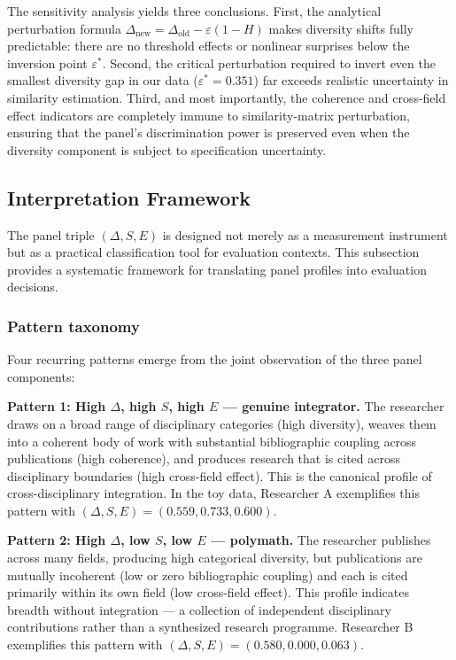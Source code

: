 \documentclass[
]{article}
\begin{document}
The sensitivity analysis yields three conclusions. First, the analytical
perturbation formula
\(\Delta_{\text{new}} = \Delta_{\text{old}} - \varepsilon(1-H)\) makes
diversity shifts fully predictable: there are no threshold effects or
nonlinear surprises below the inversion point \(\varepsilon^*\). Second,
the critical perturbation required to invert even the smallest diversity
gap in our data (\(\varepsilon^* = 0.351\)) far exceeds realistic
uncertainty in similarity estimation. Third, and most importantly, the
coherence and cross-field effect indicators are completely immune to
similarity-matrix perturbation, ensuring that the panel's discrimination
power is preserved even when the diversity component is subject to
specification uncertainty.

\hypertarget{interpretation-framework}{%
\subsection{Interpretation Framework}\label{interpretation-framework}}

The panel triple \((\Delta, S, E)\) is designed not merely as a
measurement instrument but as a practical classification tool for
evaluation contexts. This subsection provides a systematic framework for
translating panel profiles into evaluation decisions.

\hypertarget{pattern-taxonomy}{%
\subsubsection{Pattern taxonomy}\label{pattern-taxonomy}}

Four recurring patterns emerge from the joint observation of the three
panel components:

\textbf{Pattern 1: High \(\Delta\), high \(S\), high \(E\) --- genuine
integrator.} The researcher draws on a broad range of disciplinary
categories (high diversity), weaves them into a coherent body of work
with substantial bibliographic coupling across publications (high
coherence), and produces research that is cited across disciplinary
boundaries (high cross-field effect). This is the canonical profile of
cross-disciplinary integration. In the toy data, Researcher A
exemplifies this pattern with
\((\Delta, S, E) = (0.559, 0.733, 0.600)\).

\textbf{Pattern 2: High \(\Delta\), low \(S\), low \(E\) --- polymath.}
The researcher publishes across many fields, producing high categorical
diversity, but publications are mutually incoherent (low or zero
bibliographic coupling) and each is cited primarily within its own field
(low cross-field effect). This profile indicates breadth without
integration --- a collection of independent disciplinary contributions
rather than a synthesized research programme. Researcher B exemplifies
this pattern with \((\Delta, S, E) = (0.580, 0.000, 0.063)\).
\end{document}
